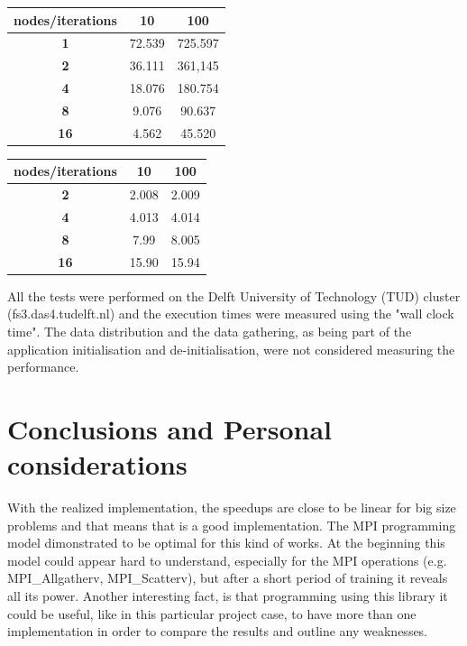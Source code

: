 \documentclass[a4paper]{article}
\begin{document}
\begin{minipage}[b]{.40\textwidth}
  \centering
\begin{tabular}{|c|c|c|}
\hline
\textbf{nodes/iterations} & \textbf{10} & \textbf{100} \\ \hline
\textbf{1}                & 72.539      & 725.597      \\ \hline
\textbf{2}                & 36.111      & 361,145      \\ \hline
\textbf{4}                & 18.076      & 180.754      \\ \hline
\textbf{8}                & 9.076       & 90.637       \\ \hline
\textbf{16}               & 4.562       & 45.520       \\ \hline
\end{tabular}
  \label{tab:R3_t1}
\end{minipage} \qquad
\begin{minipage}[b]{.40\textwidth}
  \centering
\begin{tabular}{|c|c|c|}
\hline
\textbf{nodes/iterations} & \textbf{10} & \textbf{100} \\ \hline
\textbf{2}                & 2.008       & 2.009        \\ \hline
\textbf{4}                & 4.013       & 4.014        \\ \hline
\textbf{8}                & 7.99        & 8.005        \\ \hline
\textbf{16}               & 15.90       & 15.94        \\ \hline
\end{tabular}
  \label{tab:R3_t2}
\end{minipage}

\vspace{8mm}	

All the tests were performed on the Delft University of Technology (TUD) cluster (fs3.das4.tudelft.nl) and the execution times were measured using the "wall clock time". The data distribution and the data gathering, as being part of the application initialisation and de-initialisation, were not considered measuring the performance.

\section{Conclusions and Personal considerations}
\label{sec:con}
With the realized implementation, the speedups are close to be linear for big size problems and that means that is a good implementation. The MPI programming model dimonstrated to be optimal for this kind of works. At the beginning this model could appear hard to understand, especially for the MPI operations (e.g. MPI\_Allgatherv, MPI\_Scatterv), but after a short period of training it reveals all its power. Another interesting fact, is that programming using this library it could be useful, like in this particular project case, to have more than one implementation in order to compare the results and outline any weaknesses.  

		
\printbibliography 
\end{document}
